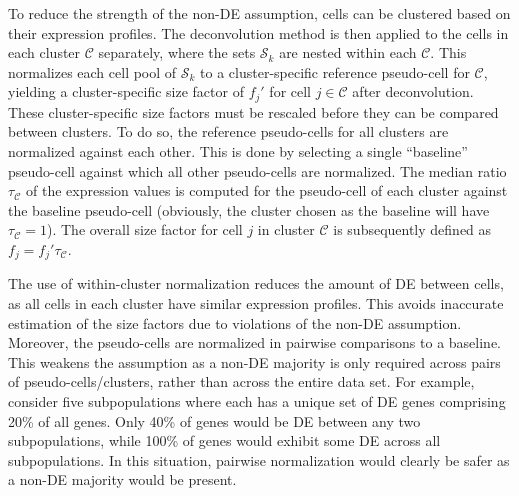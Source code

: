 \documentclass{bmcart}
\begin{document}
To reduce the strength of the non-DE assumption, cells can be clustered based on their expression profiles.
The deconvolution method is then applied to the cells in each cluster $\mathcal{C}$ separately,
    where the sets $\mathcal{S}_k$ are nested within each $\mathcal{C}$.
This normalizes each cell pool of $\mathcal{S}_k$ to a cluster-specific reference pseudo-cell for $\mathcal{C}$,
    yielding a cluster-specific size factor of $f_{j}'$ for cell $j \in \mathcal{C}$ after deconvolution.
These cluster-specific size factors must be rescaled before they can be compared between clusters.
To do so, the reference pseudo-cells for all clusters are normalized against each other.
This is done by selecting a single ``baseline'' pseudo-cell against which all other pseudo-cells are normalized.
The median ratio $\tau_{\mathcal{C}}$ of the expression values is computed for the pseudo-cell of each cluster against the baseline pseudo-cell
    (obviously, the cluster chosen as the baseline will have $\tau_{\mathcal{C}}=1$).
The overall size factor for cell $j$ in cluster $\mathcal{C}$ is subsequently defined as $f_j = f_{j}'\tau_{\mathcal{C}}$.


The use of within-cluster normalization reduces the amount of DE between cells, as all cells in each cluster have similar expression profiles.
This avoids inaccurate estimation of the size factors due to violations of the non-DE assumption.
Moreover, the pseudo-cells are normalized in pairwise comparisons to a baseline.
This weakens the assumption as a non-DE majority is only required across pairs of pseudo-cells/clusters, rather than across the entire data set.
For example, consider five subpopulations where each has a unique set of DE genes comprising 20\% of all genes.
Only 40\% of genes would be DE between any two subpopulations, while 100\% of genes would exhibit some DE across all subpopulations.
In this situation, pairwise normalization would clearly be safer as a non-DE majority would be present.
\end{document}
